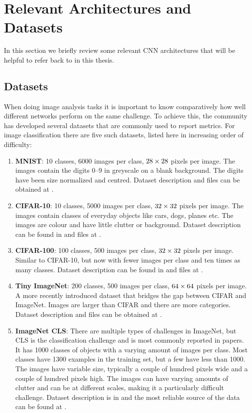 \section{Relevant Architectures and Datasets}
In this section we briefly review some relevant CNN architectures that will be
helpful to refer back to in this thesis.

\subsection{Datasets}
When doing image analysis tasks it is important to know comparatively how well
different networks perform on the same challenge. To achieve this, the
community has developed several datasets that are commonly used to report
metrics. For image classification there are five such datasets, listed here in
increasing order of difficulty:
\begin{enumerate}
  \item \textbf{MNIST}: 10 classes, 6000 images per class, $28\times 28$ pixels per image.
    The images contain the digits 0--9 in greyscale on a blank background. The
    digits have been size normalized and centred. Dataset description and files can be obtained
    at \cite{lecun_modified_1998}.
  \item \textbf{CIFAR-10}: 10 classes, 5000 images per class, $32\times 32$ pixels per image.
    The images contain classes of everyday objects like cars, dogs, planes etc.
    The images are colour and have little clutter or background. Dataset
    description can be found in \cite{krizhevsky_learning_2009} and files at
    \cite{krizhevsky_cifar_2009}.
  \item \textbf{CIFAR-100}: 100 classes, 500 images per class, $32\times 32$ pixels per image.
    Similar to CIFAR-10, but now with fewer images per class and ten times as
    many classes. Dataset description can be found in
    \cite{krizhevsky_learning_2009} and files at \cite{krizhevsky_cifar_2009}.
  \item \textbf{Tiny ImageNet}: 200 classes, 500 images per class,
    $64 \times 64$ pixels per image. A more recently introduced dataset that bridges
    the gap between CIFAR and ImageNet. Images are larger than CIFAR and there
    are more categories. Dataset description and files can be obtained at \cite{li_tiny_2017}.
  \item \textbf{ImageNet CLS}: There are multiple types of challenges in ImageNet, but CLS
    is the classification challenge and is most commonly reported in papers.
    It has 1000 classes of objects with a varying amount of images per class.
    Most classes have 1300 examples in the training set, but a few have less
    than 1000. The images have variable size, typically a couple of hundred
    pixels wide and a couple of hundred pixels high. The images can have varying
    amounts of clutter and can be at different scales, making it a particularly
    difficult challenge. Dataset description is in
    \cite{russakovsky_imagenet_2014} and the most reliable source of the data
    can be found at \cite{stanford_vision_lab_imagenet_2017}.
\end{enumerate}
